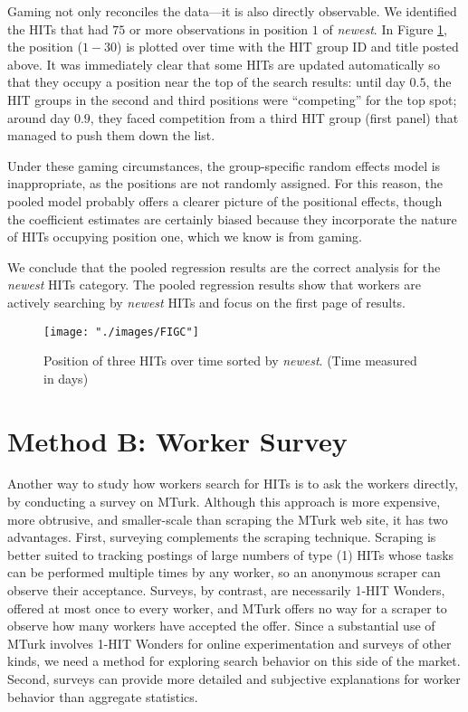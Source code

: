 \documentclass{sig-alternate}
\begin{document}
Gaming not only reconciles the data---it is also directly
observable.  We identified the HITs that had $75$ or more observations
in position $1$ of {\em newest}. In Figure \ref{fig:C}, the position
($1-30$) is plotted over time with the HIT group ID and title posted
above.  It was immediately clear that some HITs are updated
automatically so that they occupy a position near the top of the search results: until day $0.5$, the HIT groups in the second
and third positions were ``competing'' for the top
spot; around day $0.9$, they faced competition from a third HIT group
(first panel) that managed to push them down the list.

Under these gaming circumstances, the group-specific random effects
model is inappropriate, as the positions are not randomly
assigned.  For this reason, the pooled model probably offers a
clearer picture of the positional effects, though the coefficient
estimates are certainly biased because they incorporate the nature of
HITs occupying position one, which we know is from gaming.

We conclude that the pooled regression results are the correct analysis for the {\em newest} HITs category.  
The pooled regression results show that workers are actively searching by {\em newest} HITs and focus on the first page of results.

\begin{figure}
\centering
\texttt{[image: "./images/FIGC"]}
\caption{Position of three HITs over time sorted by {\em newest}. (Time measured in days)}\label{fig:C}
\end{figure}

\section{Method B: Worker Survey}
Another way to study how workers search for HITs is to ask the workers
directly, by conducting a survey on MTurk. Although this approach is more
expensive, more obtrusive, and smaller-scale than scraping the MTurk
web site, it has two advantages.  First, surveying complements the
scraping technique.  Scraping is better suited to tracking postings of
large numbers of type (1) HITs whose tasks can be performed multiple times by any worker,
so an anonymous scraper can observe their acceptance.  Surveys, by
contrast, are necessarily 1-HIT Wonders, offered at most once to every
worker, and MTurk offers no way for a scraper to observe how many
workers have accepted the offer.  Since a substantial use of MTurk
involves 1-HIT Wonders for online experimentation and surveys of other
kinds, we need a method for exploring search behavior on this side of
the market.  Second, surveys can provide more detailed and subjective
explanations for worker behavior than aggregate statistics.
\end{document}
